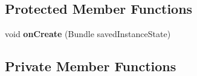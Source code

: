 \subsection*{Protected Member Functions}
\begin{DoxyCompactItemize}
\item 
void {\bfseries on\+Create} (Bundle saved\+Instance\+State)\hypertarget{classcom_1_1example_1_1sebastian_1_1tindertp_1_1ChatListActivity_afa6856fde2448543904cda4dfe9b21a5}{}\label{classcom_1_1example_1_1sebastian_1_1tindertp_1_1ChatListActivity_afa6856fde2448543904cda4dfe9b21a5}

\end{DoxyCompactItemize}
\subsection*{Private Member Functions}
